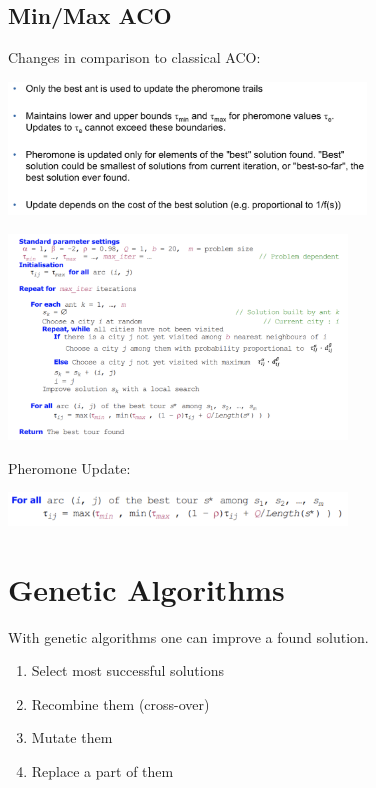 \documentclass[10pt,a4paper,twocolumn]{article}
\begin{document}
\subsection{Min/Max ACO}

Changes in comparison to classical ACO:
\begin{center}
	\includegraphics[width=9.5cm]{images/min-max-aco}
\end{center}

\begin{center}
	\includegraphics[width=9cm]{images/min-max-aco2}
\end{center}

Pheromone Update:
\begin{center}
	\includegraphics[width=9cm]{images/mmas-tsp}
\end{center}




\section{Genetic Algorithms}
With genetic algorithms one can improve a found solution.


\begin{enumerate}
	\item Select most successful solutions
	\item Recombine them (cross-over)
	\item Mutate them 
	\item Replace a part of them
\end{enumerate}
\end{document}

